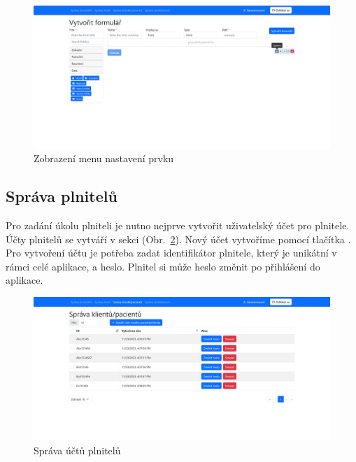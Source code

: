 \begin{figure}[H]
    \includegraphics[width=\textwidth]{../img/screenshots/odvozena-hodnota-ozubene-kolo}
    \caption{Zobrazení menu nastavení prvku}\label{fig:odvozena-hodnota-ozubene-kolo}
\end{figure}

\subsection{Správa plnitelů}\label{subsec:sprava-plnitelu}

Pro zadání úkolu plniteli je nutno nejprve vytvořit uživatelský účet pro plnitele.
Účty plnitelů se vytváří v sekci  (Obr.~\ref{fig:sprava-plnitelu-screenshot}).
Nový účet vytvoříme pomocí tlačítka .
Pro vytvoření účtu je potřeba zadat identifikátor plnitele, který je unikátní v rámci celé aplikace, a heslo.
Plnitel si může heslo změnit po přihlášení do aplikace.

\begin{figure}[H]
    \includegraphics[width=\textwidth]{../img/screenshots/sprava-plnitelu}
    \caption{Správa účtů plnitelů}\label{fig:sprava-plnitelu-screenshot}
\end{figure}

